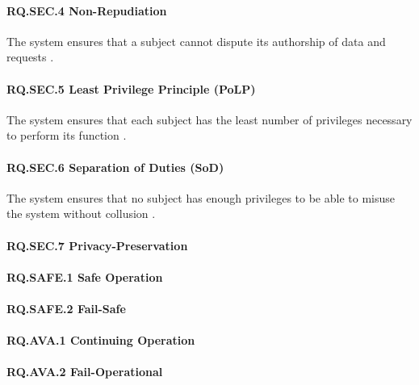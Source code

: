 \paragraph{RQ.SEC.4 Non-Repudiation}
The system ensures that a subject cannot dispute its authorship of data and requests \cite{Eckert2023}.
\paragraph{RQ.SEC.5 Least Privilege Principle (PoLP)}
The system ensures that each subject has the least number of privileges necessary to perform its function \cite{JTF2020}.
\paragraph{RQ.SEC.6 Separation of Duties (SoD)}
The system ensures that no subject has enough privileges to be able to misuse the system without collusion \cite{JTF2020}.
\paragraph{RQ.SEC.7 Privacy-Preservation}

\paragraph{RQ.SAFE.1 Safe Operation}
\paragraph{RQ.SAFE.2 Fail-Safe}

\paragraph{RQ.AVA.1 Continuing Operation}
\paragraph{RQ.AVA.2 Fail-Operational}

